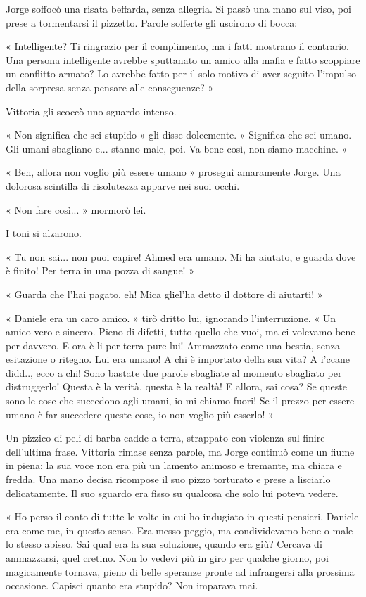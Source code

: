 Jorge soffocò una risata beffarda, senza allegria. Si passò una mano sul viso, poi prese a tormentarsi il pizzetto. Parole sofferte gli uscirono di bocca:

« Intelligente? Ti ringrazio per il complimento, ma i fatti mostrano il contrario. Una persona intelligente avrebbe sputtanato un amico alla mafia e fatto scoppiare un conflitto armato? Lo avrebbe fatto per il solo motivo di aver seguito l'impulso della sorpresa senza pensare alle conseguenze? »

Vittoria gli scoccò uno sguardo intenso.

« Non significa che sei stupido » gli disse dolcemente. « Significa che sei umano. Gli umani sbagliano e... stanno male, poi. Va bene così, non siamo macchine. »

« Beh, allora non voglio più essere umano » proseguì amaramente Jorge. Una dolorosa scintilla di risolutezza apparve nei suoi occhi.

« Non fare così... » mormorò lei.

I toni si alzarono.

« Tu non sai... non puoi capire! Ahmed era umano. Mi ha aiutato, e guarda dove è finito! Per terra in una pozza di sangue! »

« Guarda che l'hai pagato, eh! Mica gliel'ha detto il dottore di aiutarti! »

« Daniele era un caro amico. » tirò dritto lui, ignorando l'interruzione. « Un amico vero e sincero. Pieno di difetti, tutto quello che vuoi, ma ci volevamo bene per davvero. E ora è li per terra pure lui! Ammazzato come una bestia, senza esitazione o ritegno. Lui era umano! A chi è importato della sua vita? A i'ccane didd.., ecco a chi! Sono bastate due parole sbagliate al momento sbagliato per distruggerlo! Questa è la verità, questa è la realtà! E allora, sai cosa? Se queste sono le cose che succedono agli umani, io mi chiamo fuori! Se il prezzo per essere umano è far succedere queste cose, io non voglio più esserlo! »

Un pizzico di peli di barba cadde a terra, strappato con violenza sul finire dell'ultima frase. Vittoria rimase senza parole, ma Jorge continuò come un fiume in piena: la sua voce non era più un lamento animoso e tremante, ma chiara e fredda. Una mano decisa ricompose il suo pizzo torturato e prese a lisciarlo delicatamente. Il suo sguardo era fisso su qualcosa che solo lui poteva vedere.

« Ho perso il conto di tutte le volte in cui ho indugiato in questi pensieri. Daniele era come me, in questo senso. Era messo peggio, ma condividevamo bene o male lo stesso abisso. Sai qual era la sua soluzione, quando era giù? Cercava di ammazzarsi, quel cretino. Non lo vedevi più in giro per qualche giorno, poi magicamente tornava, pieno di belle speranze pronte ad infrangersi alla prossima occasione. Capisci quanto era stupido? Non imparava mai.

